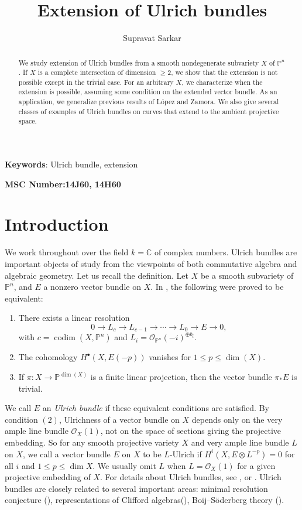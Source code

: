 \documentclass[11pt,letterpaper]{amsart}
\title{Extension of Ulrich bundles}
\author{\small{Supravat Sarkar}}
\date{}
\begin{document}
\begin{abstract}
We study extension of Ulrich bundles from a smooth nondegenerate subvariety $X$ of $\mathbb{P}^n$. If $X$ is a complete intersection of dimension $\geq 2$, we show that the extension is not possible except in the trivial case. For an arbitrary $X$, we characterize when the extension is possible, assuming some condition on the extended vector bundle. As an application, we generalize previous results of L{\'o}pez and Zamora. We also give several classes of examples of Ulrich bundles on curves that extend to the ambient projective space.
\end{abstract}
\maketitle
\begin{center}
\textbf{Keywords}: Ulrich bundle, extension
\end{center}
\begin{center}
\textbf{MSC Number:14J60, 14H60} 
\end{center}

\section{Introduction}
We work throughout over the field $k=\mathbb{C}$ of complex numbers. Ulrich bundles are important objects of study from the viewpoints of both commutative algebra and algebraic geometry. Let us recall the definition. Let $X$ be a smooth subvariety of $\mathbb{P}^n$, and $E$ a nonzero vector bundle on $X$. In \cite{eisenbud2003resultants}, the following were proved to be equivalent:
\begin{enumerate}
\item There exists a linear resolution
\[
0 \to L_c \to L_{c-1} \to \cdots \to L_0 \to E \to 0,
\]
with $c=\operatorname{codim}(X,\mathbb{P}^n)$
and $L_i=\mathcal{O}_{\mathbb{P}^n}(-i)^{\oplus b_i}.$

\item The cohomology $H^\bullet(X,E(-p))$
vanishes for $1\le p\le \dim(X).$

\item If $\pi:X\to \mathbb{P}^{\dim(X)}$
is a finite linear projection, then the vector bundle $\pi_*E$
is trivial.
\end{enumerate}
We call $E$ an \textit{Ulrich bundle} if these equivalent conditions are satisfied. By condition $(2)$, Ulrichness of a vector bundle on $X$ depends only on the very ample line bundle $\mathcal{O}_X(1)$, not on the space of sections giving the projective embedding. So for any smooth projective variety $X$ and very ample line bundle $L$ on $X$, we call a vector bundle $E$ on $X$ to be $L$-Ulrich if $H^i(X, E\otimes L^{-p})=0$ for all $i$ and $1\leq p\leq \dim X.$ We usually omit $L$ when $L=\mathcal{O}_X(1)$ for a given projective embedding of $X$. For details about Ulrich bundles, see \cite{beauville2018introduction}, \cite{coskun2017survey} or \cite{costa2021ulrich}. Ulrich bundles are closely related to several important areas: minimal resolution conjecture (\cite{aprodu2012minimal}), representations of Clifford algebras(\cite{coskun2012pfaffian}), Boij--S{\"o}derberg theory (\cite{eisenbud2011boij}).
\end{document}
